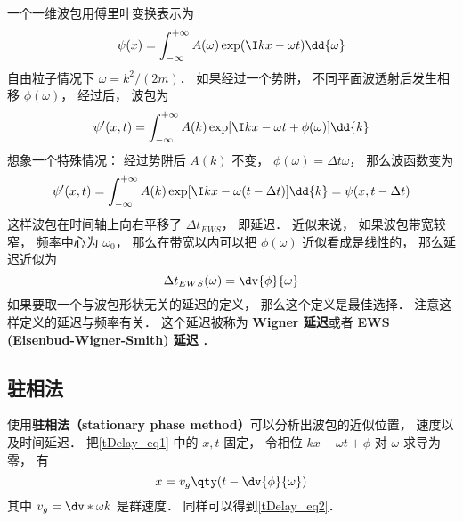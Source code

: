 
\begin{issues}
\issueDraft
\end{issues}

一个一维波包用傅里叶变换表示为
\begin{equation}
\psi(x) = \int_{-\infty}^{+\infty} A(\omega) \exp(\I kx - \omega t) \dd{\omega}
\end{equation}
自由粒子情况下 $\omega = k^2/(2m)$． 如果经过一个势阱， 不同平面波透射后发生相移 $\phi(\omega)$， 经过后， 波包为
\begin{equation}\label{tDelay_eq1}
\psi'(x, t) = \int_{-\infty}^{+\infty} A(k) \exp[\I kx - \omega t + \phi(\omega)] \dd{k}
\end{equation}
想象一个特殊情况： 经过势阱后 $A(k)$ 不变， $\phi(\omega) = \Delta t \omega$， 那么波函数变为
\begin{equation}
\psi'(x, t) = \int_{-\infty}^{+\infty} A(k) \exp[\I kx - \omega (t - \Delta t) ] \dd{k}
= \psi(x, t - \Delta t)
\end{equation}
这样波包在时间轴上向右平移了 $\Delta t_{EWS}$， 即延迟． 近似来说， 如果波包带宽较窄， 频率中心为 $\omega_0$， 那么在带宽以内可以把 $\phi(\omega)$ 近似看成是线性的， 那么延迟近似为
\begin{equation}\label{tDelay_eq2}
\Delta t_{EWS}(\omega) = \dv{\phi}{\omega}
\end{equation}
如果要取一个与波包形状无关的延迟的定义， 那么这个定义是最佳选择． 注意这样定义的延迟与频率有关． 这个延迟被称为 \textbf{Wigner 延迟}或者 \textbf{EWS (Eisenbud-Wigner-Smith) 延迟} ．

\subsection{驻相法}
使用\textbf{驻相法（stationary phase method）}可以分析出波包的近似位置， 速度以及时间延迟． 把\autoref{tDelay_eq1} 中的 $x, t$ 固定， 令相位 $kx - \omega t + \phi$ 对 $\omega$ 求导为零， 有
\begin{equation}
x = v_g \qty(t - \dv{\phi}{\omega})
\end{equation}
其中 $v_g = \dv*{\omega}{k}$ 是群速度． 同样可以得到\autoref{tDelay_eq2}．
